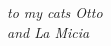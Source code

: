 %
%
\cleardoublepage
%
%
\thispagestyle{empty}
%
%
%
\begin{flushright}
\textit{to my cats Otto\\ and La Micia}
\end{flushright}
%
%
